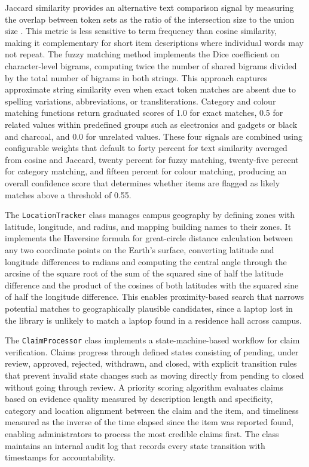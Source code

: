 \documentclass[conference]{IEEEtran}
\begin{document}
Jaccard similarity provides an alternative text comparison signal by measuring the overlap between token sets as the ratio of the intersection size to the union size \cite{cosine}. This metric is less sensitive to term frequency than cosine similarity, making it complementary for short item descriptions where individual words may not repeat. The fuzzy matching method implements the Dice coefficient on character-level bigrams, computing twice the number of shared bigrams divided by the total number of bigrams in both strings. This approach captures approximate string similarity even when exact token matches are absent due to spelling variations, abbreviations, or transliterations. Category and colour matching functions return graduated scores of 1.0 for exact matches, 0.5 for related values within predefined groups such as electronics and gadgets or black and charcoal, and 0.0 for unrelated values. These four signals are combined using configurable weights that default to forty percent for text similarity averaged from cosine and Jaccard, twenty percent for fuzzy matching, twenty-five percent for category matching, and fifteen percent for colour matching, producing an overall confidence score that determines whether items are flagged as likely matches above a threshold of 0.55.

The \texttt{LocationTracker} class manages campus geography by defining zones with latitude, longitude, and radius, and mapping building names to their zones. It implements the Haversine formula for great-circle distance calculation between any two coordinate points on the Earth's surface, converting latitude and longitude differences to radians and computing the central angle through the arcsine of the square root of the sum of the squared sine of half the latitude difference and the product of the cosines of both latitudes with the squared sine of half the longitude difference. This enables proximity-based search that narrows potential matches to geographically plausible candidates, since a laptop lost in the library is unlikely to match a laptop found in a residence hall across campus.

The \texttt{ClaimProcessor} class implements a state-machine-based workflow for claim verification. Claims progress through defined states consisting of pending, under review, approved, rejected, withdrawn, and closed, with explicit transition rules that prevent invalid state changes such as moving directly from pending to closed without going through review. A priority scoring algorithm evaluates claims based on evidence quality measured by description length and specificity, category and location alignment between the claim and the item, and timeliness measured as the inverse of the time elapsed since the item was reported found, enabling administrators to process the most credible claims first. The class maintains an internal audit log that records every state transition with timestamps for accountability.
\end{document}
